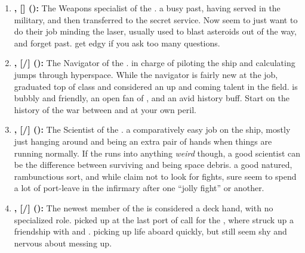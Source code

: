 \documentclass[blue]{TMFHope}
\begin{document}
\begin{enumerate}
  \item \textbf{\cWeap{\full}, [\cWeap{\they}\/\cWeap{\them}] (\cWeap{\MYplayer}):} The Weapons specialist of the \pNew{}. \cWeap{\They} \cWeap{\have} a busy past, having served in the military, and then transferred to the secret service. Now \cWeap{\they} seem\cWeap{\plural} to just want to do their job minding the \pNew{} laser, usually used to blast asteroids out of the way, and forget \cWeap{\their} past. \cWeap{} get\cWeap{\plural} edgy if you ask too many questions.
  
  \item \textbf{\cNav{\full}, [\cNav{\they}/\cNav{\them}] (\cNav{\MYplayer}):} The Navigator of the \pNew{}. \cNav{\They} \cNav{\are} in charge of piloting the ship and calculating jumps through hyperspace. While the \pNew{} navigator is fairly new at the job, \cNav{\they} graduated top of \cNav{\their} class and \cNav{\are} considered an up and coming talent in the field. \cNav{} is bubbly and friendly, an open fan\cNav{\kid} of \cCap{}, and an avid history buff. Start \cNav{\them} on the history of the war between \pPlan{} and \pEdge{} at your own peril.
  
  \item \textbf{\cSci{\full}, [\cSci{\they}/\cSci{\them}] (\cSci{\MYplayer}):} The Scientist of the \pNew{}. \cSci{\They} \cSci{\have} a comparatively easy job on the ship, mostly just hanging around and being an extra pair of hands when things are running normally. If the \pNew{} runs into anything \emph{weird} though, a good scientist can be the difference between surviving and being space debris. \cSci{\They} \cSci{\are} a good natured, rambunctious sort, and while \cSci{\they} claim not to look for fights, \cSci{\they} sure seem\cSci{\plural} to spend a lot of \cSci{\their} port-leave in the infirmary after one ``jolly fight'' or another.
  
  \item \textbf{\cBoy{\full}, [\cBoy{\they}/\cBoy{\them}] (\cBoy{\MYplayer}):} The newest member of the \pNew{} is considered a deck hand, with no specialized role. \cBoy{\They} \cBoy{\were} picked up at the last port of call for the \pNew{}, where \cBoy{\they} struck up a friendship with \cEng{} and \cNav{}. \cBoy{\They} \cBoy{\are} picking up life aboard \pNew{} quickly, but still seem shy and nervous about messing up.
\end{enumerate}
\end{document}
